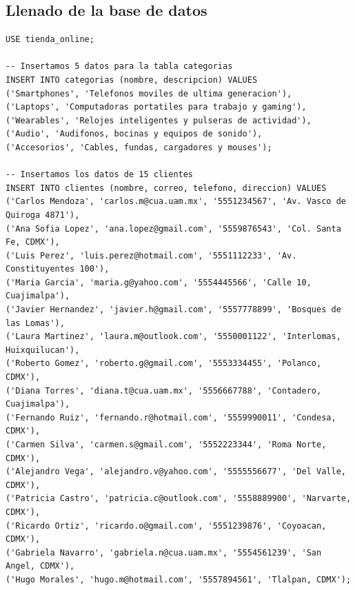 \documentclass[12pt,a4paper]{article}
\begin{document}
\subsection{Llenado de la base de datos}
\begin{lstlisting}
USE tienda_online;

-- Insertamos 5 datos para la tabla categorias
INSERT INTO categorias (nombre, descripcion) VALUES 
('Smartphones', 'Telefonos moviles de ultima generacion'),
('Laptops', 'Computadoras portatiles para trabajo y gaming'),
('Wearables', 'Relojes inteligentes y pulseras de actividad'),
('Audio', 'Audifonos, bocinas y equipos de sonido'),
('Accesorios', 'Cables, fundas, cargadores y mouses');

-- Insertamos los datos de 15 clientes
INSERT INTO clientes (nombre, correo, telefono, direccion) VALUES 
('Carlos Mendoza', 'carlos.m@cua.uam.mx', '5551234567', 'Av. Vasco de Quiroga 4871'),
('Ana Sofia Lopez', 'ana.lopez@gmail.com', '5559876543', 'Col. Santa Fe, CDMX'),
('Luis Perez', 'luis.perez@hotmail.com', '5551112233', 'Av. Constituyentes 100'),
('Maria Garcia', 'maria.g@yahoo.com', '5554445566', 'Calle 10, Cuajimalpa'),
('Javier Hernandez', 'javier.h@gmail.com', '5557778899', 'Bosques de las Lomas'),
('Laura Martinez', 'laura.m@outlook.com', '5550001122', 'Interlomas, Huixquilucan'),
('Roberto Gomez', 'roberto.g@gmail.com', '5553334455', 'Polanco, CDMX'),
('Diana Torres', 'diana.t@cua.uam.mx', '5556667788', 'Contadero, Cuajimalpa'),
('Fernando Ruiz', 'fernando.r@hotmail.com', '5559990011', 'Condesa, CDMX'),
('Carmen Silva', 'carmen.s@gmail.com', '5552223344', 'Roma Norte, CDMX'),
('Alejandro Vega', 'alejandro.v@yahoo.com', '5555556677', 'Del Valle, CDMX'),
('Patricia Castro', 'patricia.c@outlook.com', '5558889900', 'Narvarte, CDMX'),
('Ricardo Ortiz', 'ricardo.o@gmail.com', '5551239876', 'Coyoacan, CDMX'),
('Gabriela Navarro', 'gabriela.n@cua.uam.mx', '5554561239', 'San Angel, CDMX'),
('Hugo Morales', 'hugo.m@hotmail.com', '5557894561', 'Tlalpan, CDMX');


\end{lstlisting}
\end{document}

